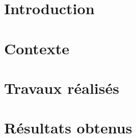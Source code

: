 \documentclass[language=en, year=1A, enterprise=ensIIE]{ensiie-report}
\begin{document}
\renewcommand{\listfigurename}{Liste des figures}
\listoffigures\label{sec:lof}
\newpage


\renewcommand{\contentsname}{Table des matières}
\tableofcontents
\label{EndFirstPages} %
\newpage


\pagestyle{MainPages}

\section{Introduction}\label{sec:introduction}


\newpage


\section{Contexte}\label{sec:contexte}


\newpage


\section{Travaux réalisés}\label{sec:travaux_realises}


\newpage


\section{Résultats obtenus}\label{sec:resultats_obtenus}
\end{document}
